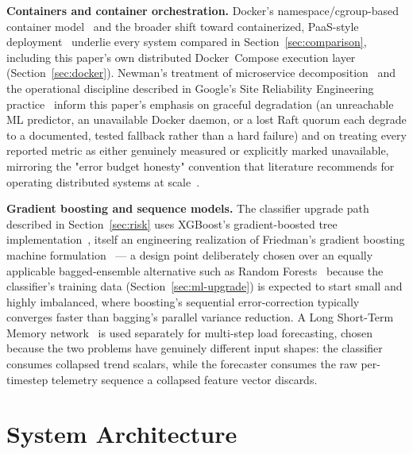 \documentclass[conference]{IEEEtran}
\begin{document}
\textbf{Containers and container orchestration.} Docker's namespace/cgroup-based container
model~\cite{merkel2014docker} and the broader shift toward containerized, PaaS-style
deployment~\cite{pahl2015containerization} underlie every system compared in
Section~\ref{sec:comparison}, including this paper's own distributed Docker~Compose execution layer
(Section~\ref{sec:docker}). Newman's treatment of microservice decomposition~\cite{newman2015microservices}
and the operational discipline described in Google's Site Reliability Engineering
practice~\cite{beyer2016sre} inform this paper's emphasis on graceful degradation (an unreachable ML
predictor, an unavailable Docker daemon, or a lost Raft quorum each degrade to a documented, tested
fallback rather than a hard failure) and on treating every reported metric as either genuinely measured
or explicitly marked unavailable, mirroring the "error budget honesty" convention that literature
recommends for operating distributed systems at scale~\cite{barroso2018datacenter}.

\textbf{Gradient boosting and sequence models.} The classifier upgrade path described in
Section~\ref{sec:risk} uses XGBoost's gradient-boosted tree implementation~\cite{chen2016xgboost},
itself an engineering realization of Friedman's gradient boosting machine
formulation~\cite{friedman2001gradient} — a design point deliberately chosen over an equally
applicable bagged-ensemble alternative such as Random Forests~\cite{breiman2001randomforests} because
the classifier's training data (Section~\ref{sec:ml-upgrade}) is expected to start small and highly
imbalanced, where boosting's sequential error-correction typically converges faster than bagging's
parallel variance reduction. A Long Short-Term Memory network~\cite{hochreiter1997lstm} is used
separately for multi-step load forecasting, chosen because the two problems have genuinely different
input shapes: the classifier consumes collapsed trend scalars, while the forecaster consumes the raw
per-timestep telemetry sequence a collapsed feature vector discards.

\section{System Architecture}
\label{sec:architecture}
\end{document}
